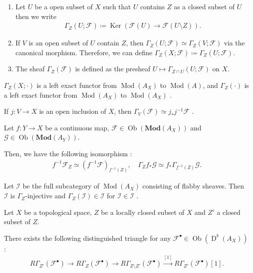 \documentclass[a4paper,dvipdfmx,reqno,12pt]{amsart}
\theoremstyle{definition}
\newcommand{\deq}{\coloneqq}
\newcommand{\mcal}[1]{\mathcal{#1}}%
\newcommand{\opn}[1]{\operatorname{#1}}
\newcommand{\catn}[1]{\mathbf{#1}}
\newcommand{\xto}[1]{\xrightarrow{#1}}
\numberwithin{equation}{section}
\begin{document}
\begin{enumerate}
\item Let $U$ be a open subset of $X$ such that $U$ contains
$Z$ as a closed subset of $U$ then we write
\begin{align}
  \Gamma_Z(U;\mcal{F})\deq \opn{Ker}(\mcal{F}(U) \to 
\mcal{F}(U\setminus Z)).
\end{align}
\item If $V$ is an open subset of $U$ contain $Z$, then
$\Gamma_{Z}(U;\mcal{F})\simeq \Gamma_{Z}(V;\mcal{F})$
via the canonical morphism. Therefore, we can define
$\Gamma_{Z}(X;\mcal{F})\deq \Gamma_{Z}(U;\mcal{F})$.
\item The sheaf $\Gamma_{Z}(\mcal{F})$ is defined as the presheaf 
$U\mapsto \Gamma_{Z\cap U}(U;\mcal{F})$ on $X$.
\end{enumerate}

$\Gamma_Z(X;\cdot)$ is a left exact functor from 
$\opn{Mod}(A_X)$ to $\opn{Mod}(A)$,
and $\Gamma_{Z}(\cdot)$ is a left exact functor from
$\opn{Mod}(A_X)$ to $\opn{Mod}(A_X)$ 
\cite[Proposition 2.3.9 (i)]{MR1299726}.



If $j\colon V\to X$ is an open inclusion of $X$, then 
$\Gamma_V(\mathcal{F})\simeq j_*j^{-1}\mathcal{F}$ 
\cite[Proposition 2.3.9 (iii)]{MR1299726}.

Let $f\colon Y\to X$ be a continuous map,
$\mathcal{F}\in \opn{Ob}(\catn{Mod}(A_X))$
and $\mathcal{G}\in\opn{Ob}(\catn{Mod}(A_Y))$.

Then, we have the following isomorphism 
\cite[(2.3.19)-(2.3.20)]{MR1299726}:
\begin{align}
f^{-1}\mathcal{F}_Z\simeq 
(f^{-1}\mathcal{F})_{f^{-1}(Z)},\quad 
\Gamma_Zf_*\mathcal{G}\simeq f_*\Gamma_{f^{-1}(Z)}
\mathcal{G}.
\end{align}

Let $\mathscr{I}$ be the full subcategory of 
$\opn{Mod}(A_X)$ consisting of flabby sheaves. 
Then $\mathscr{I}$ is $\Gamma_{Z}$-injective and
$\Gamma_{Z}(\mathcal{I})\in\mathscr{I}$ for 
$\mathcal{I}\in \mathscr{I}$ \cite[Proposition 2.4.6]{MR1299726}.

Let $X$ be a topological space, $Z$ be a locally 
closed subset of $X$ and $Z'$ a closed subset of $Z$.

There exists the following distinguished triangle 
for any $\mathcal{F}^{\bullet}\in \opn{Ob}(\opn{D}^{b}(A_X))$ 
\cite[(2.6.32)]{MR1299726}:
\begin{align} \label{equation-exact-local}
  R\Gamma_{Z'}(\mcal{F}^{\bullet})\to 
R\Gamma_{Z}(\mcal{F}^{\bullet})\to 
R\Gamma_{Z\setminus Z'}(\mcal{F}^{\bullet})\xto{[1]} 
R\Gamma_{Z'}(\mcal{F}^{\bullet})[1].
\end{align}
\end{document}
